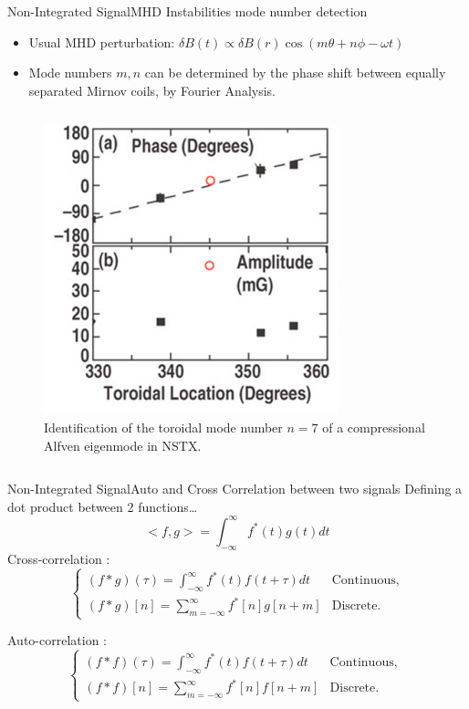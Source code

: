 \documentclass{beamer}
\begin{document}
\begin{frame}{Non-Integrated Signal}{MHD Instabilities mode number detection}
 \begin{itemize}
	\item Usual MHD perturbation: $\delta B(t) \propto \delta B(r) \cos (m\theta + n\phi -\omega t ) $
		 \item Mode numbers {\color{red}  $m, n$}  can be determined by the phase shift between equally separated Mirnov coils, by Fourier Analysis.
	 \end{itemize}
	 \begin{columns}
		 \begin{figure}[ht]
			 \begin{center}
				 \includegraphics[width=0.4 \columnwidth]{NSTX.png}
				 \caption{\tiny Identification of the toroidal mode number {\color{red}  $n=7$} of a compressional Alfven eigenmode in NSTX.}
			 \end{center}
		 \end{figure}
 	  \end{columns}
\end{frame}


\begin{frame}{Non-Integrated Signal}{Auto and Cross Correlation between two signals}
Defining a dot product between 2 functions…
$$<f,g>= \int_{-\infty}^{\infty} f^*(t) g(t) dt$$
Cross-correlation :
$$ \begin{cases}  (f \ast g) (\tau)= \int_{-\infty}^{\infty} f^*(t) f(t +\tau) dt & \text{Continuous,}\\
 (f \ast g) [n]= \sum_{m=-\infty}^{\infty} f^*[n] g[n+m]  & \text{Discrete.} \end{cases} $$

Auto-correlation :
 $$ \begin{cases} (f \ast f) (\tau)= \int_{-\infty}^{\infty} f^*(t) f(t +\tau) dt & \text{Continuous, }\\
 (f \ast f) [n]= \sum_{m=-\infty}^{\infty} f^*[n] f[n+m]  & \text{Discrete.} \end{cases} $$
\end{frame}
\end{document}
